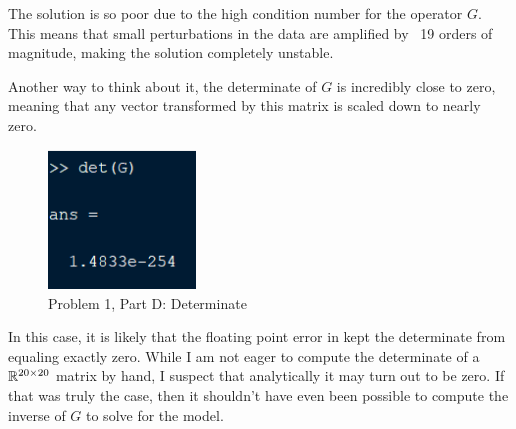 The solution is so poor due to the high condition number for the operator $G$. This means that small perturbations in the data are amplified by ~19 orders of magnitude, making the solution completely unstable. 

Another way to think about it, the determinate of $G$ is incredibly close to zero, meaning that any vector transformed by this matrix is scaled down to nearly zero. 

\begin{figure}[h] \label{fig: prob 1 part d}
	\centering
	\includegraphics[width=0.35\textwidth]{./images/prob1_partd.png}
	\caption{Problem 1, Part D: Determinate}
\end{figure}
\FloatBarrier

In this case, it is likely that the floating point error in \MATLAB kept the determinate from equaling exactly zero. While I am not eager to compute the determinate of a $\mathbb{R}^{20 \times 20}$ matrix by hand, I suspect that analytically it may turn out to be zero. If that was truly the case, then it shouldn't have even been possible to compute the inverse of $G$ to solve for the model.


